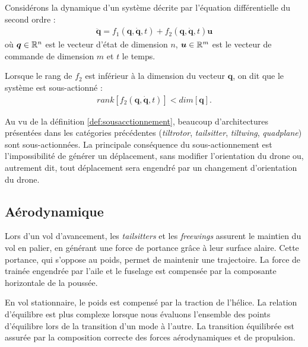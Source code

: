     \begin{definition}
        \label{def:sousacctionnement}
        Considérons la dynamique d'un système décrite par l'équation différentielle du second ordre :
        \begin{align*}
            \ddot{\boldsymbol{q}} = f_1(\boldsymbol{q}, \dot{\boldsymbol{q}}, t) + f_2(\boldsymbol{q}, \dot{\boldsymbol{q}}, t) \boldsymbol{u}
        \end{align*}
        où $\boldsymbol{q} \in {\mathbb R}^{n}$ est le vecteur d'état de dimension $n$, $\boldsymbol{u} \in {\mathbb R}^{m}$ est le vecteur de commande de dimension $m$ et $t$ le temps. 

        Lorsque le rang de $f_2$ est inférieur à la dimension du vecteur $\boldsymbol{q}$, on dit que le système est sous-actionné :
        \begin{align*}
            rank[f_2(\boldsymbol{q}, \dot{\boldsymbol{q}}, t)] < dim[\boldsymbol{q}].
        \end{align*}
    \end{definition}

    Au vu de la définition \ref{def:sousacctionnement}, beaucoup d'architectures présentées dans les catégories précédentes (\textit{tiltrotor}, \textit{tailsitter}, \textit{tiltwing}, \textit{quadplane}) sont sous-actionnées. La principale conséquence du sous-actionnement est l'impossibilité de générer un déplacement, sans modifier l'orientation du drone ou, autrement dit, tout déplacement sera engendré par un changement d'orientation du drone.
    

    \subsection{Aérodynamique}

    Lors d'un vol d'avancement, les \textit{tailsitters} et les \textit{freewings} assurent le maintien du vol en palier, en générant une force de portance grâce à leur surface alaire. Cette portance, qui s'oppose au poids, permet de maintenir une trajectoire. La force de trainée engendrée par l'aile et le fuselage est compensée par la composante horizontale de la poussée. 
    
    En vol stationnaire, le poids est compensé par la traction de l'hélice. La relation d'équilibre est plus complexe lorsque nous évaluons l'ensemble des points d'équilibre lors de la transition d'un mode à l'autre. La transition équilibrée est assurée par la composition correcte des forces aérodynamiques et de propulsion.

